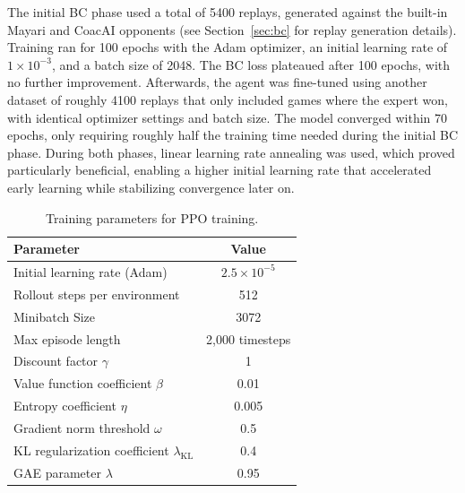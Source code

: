 \documentclass[10pt,twocolumn,letterpaper]{article}
\begin{document}
The initial BC phase used a total of 5400 replays, generated against the built-in Mayari and CoacAI opponents (see Section~\ref{sec:bc} for replay generation details). Training ran for 100 epochs with the Adam optimizer, an initial learning rate of \(1\times 10^{-3}\), and a batch size of 2048. The BC loss plateaued after 100 epochs, with no further improvement. 
Afterwards, the agent was fine-tuned using another dataset of roughly 4100 replays that only included games where the expert won, with identical optimizer settings and batch size. The model converged within 70 epochs, only requiring roughly half the training time needed during the initial BC phase. During both phases, linear learning rate annealing was used, which proved particularly beneficial, enabling  a higher initial learning rate that accelerated early learning while stabilizing convergence later on. 

\begin{table}[h]
\centering
\caption{Training parameters for PPO training.}
\begin{tabular}{l c}
\hline
\textbf{Parameter} & \textbf{Value} \\
\hline
Initial learning rate (Adam) & $2.5 \times 10^{-5}$ \\
Rollout steps per environment & 512 \\
Minibatch Size & 3072\\
Max episode length & 2,000 timesteps \\
Discount factor $\gamma$ &  1 \\
Value function coefficient $\beta$ & 0.01 \\
Entropy coefficient $\eta$ & 0.005 \\
Gradient norm threshold $\omega$ &0.5 \\
KL regularization coefficient $\lambda_{\text{KL}}$ & 0.4 \\
GAE parameter $\lambda$ & 0.95 \\
\hline
\end{tabular}
\label{tab:training_params}
\end{table} 
\end{document}
